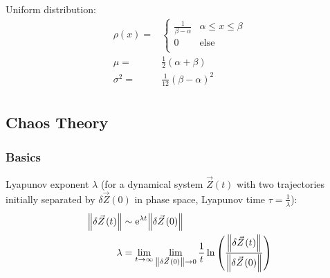 			\noindent
			Uniform distribution:
			\begin{equation}
				\begin{aligned}
					\rho(x) =& \left\{\begin{array}{ll}
					\frac{1}{\beta-\alpha} & \alpha\le x\le \beta \\
					0 & \text{else} \\
					\end{array}\right. \\
					\mu =& \frac{1}{2}(\alpha+\beta) \\
					\sigma^2 =& \frac{1}{12}(\beta-\alpha)^2 \\
				\end{aligned}
			\end{equation}

		

	\subsection{Chaos Theory}
		\subsubsection{Basics}
			Lyapunov exponent $\lambda$ (for a dynamical system $\vec{Z}(t)$ with two trajectories initially separated by $\delta\vec{Z}(0)$ in phase space, Lyapunov time $\tau=\frac{1}{\lambda}$):
			\begin{equation}
				\begin{aligned}
					\norm{\delta\vec{Z}(t)} &\sim \ex^{\lambda t} \norm{\delta\vec{Z}(0)}\\
					\lambda &= \lim_{t\rightarrow\infty} \lim_{\norm{\delta\vec{Z}(0)}\rightarrow 0} \frac{1}{t} \ln\qty(\frac{\norm{\delta \vec{Z}(t)}}{\norm{\delta\vec{Z}(0)}}) \\
				\end{aligned}
			\end{equation}